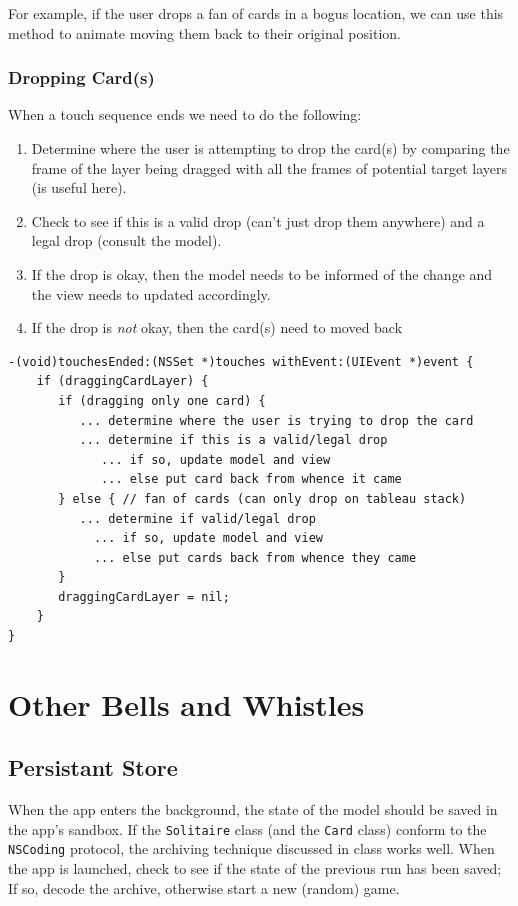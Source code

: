 \documentclass[11pt]{article}
\begin{document}
For example, if the user drops a fan of cards in a bogus location, we can
use this method to animate moving them back to their original position.

\subsubsection{Dropping Card(s)}

When a touch sequence ends we need to do the following:
\begin{enumerate}
\item Determine where the user is attempting to drop
  the card(s) by comparing the frame of
  the layer being dragged with all the frames of potential target layers
  (\verb@CGRectIntersectsRect@ is useful here).
\item Check to see if this is a valid drop (can't just drop them anywhere) 
  and a legal drop (consult the model).
\item If the drop is okay, then the model needs to be informed of the change
  and the view needs to updated accordingly.
\item If the drop is {\em not} okay, then the card(s) need to moved back
\end{enumerate}
\begin{verbatim}
-(void)touchesEnded:(NSSet *)touches withEvent:(UIEvent *)event {
    if (draggingCardLayer) {
       if (dragging only one card) {
          ... determine where the user is trying to drop the card
          ... determine if this is a valid/legal drop
             ... if so, update model and view
             ... else put card back from whence it came
       } else { // fan of cards (can only drop on tableau stack)
          ... determine if valid/legal drop
            ... if so, update model and view
            ... else put cards back from whence they came
       }
       draggingCardLayer = nil;
    }
}
\end{verbatim}

\section{Other Bells and Whistles} \label{sec:bells-and-whistles}

\subsection{Persistant Store}

When the app enters the background, the state of the model should
be saved in the app's sandbox. If the {\tt Solitaire} class (and the
{\tt Card} class) conform to the {\tt NSCoding} protocol, 
the archiving technique discussed in class works well.
When the app is launched, check to see if the state of the
previous run has been saved; If so, decode the archive,
otherwise start a new (random) game.
\end{document}
